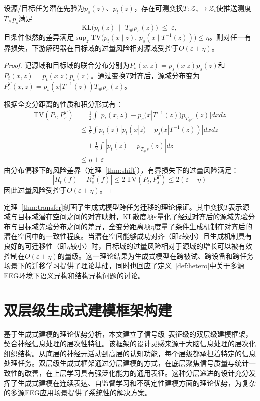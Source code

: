 \begin{theorem}[潜在对齐下的跨任务迁移界]
\label{thm:transfer}
设源/目标任务潜在先验为$p_s(z)$、$p_t(z)$，存在可测变换$T:\mathcal{Z}_s\to\mathcal{Z}_t$使推送测度$T_{\#}p_s$满足
\begin{equation}
\label{eq:latent-align}
\mathrm{KL}\!\big(p_t(z)\,\|\,T_{\#}p_s(z)\big)\;\le\;\varepsilon,
\end{equation}
且条件似然的差异满足$\sup_{z}\mathrm{TV}\!\big(p_t(x\mid z),\,p_s(x\mid T^{-1}(z))\big)\le \eta$。则对任一有界损失，下游解码器在目标域的过量风险相对源域受控于$O(\varepsilon+\eta)$。
\end{theorem}
\begin{proof}
记源域和目标域的联合分布分别为$P_s(x,z) = p_s(x|z)p_s(z)$和$P_t(x,z) = p_t(x|z)p_t(z)$。通过变换$T$对齐后，源域分布变为$P_s^T(x,z) = p_s(x|T^{-1}(z))T_{\#}p_s(z)$。

根据全变分距离的性质和积分形式有：
\begin{equation}
\begin{aligned}
\mathrm{TV}(P_t, P_s^T) &= \frac{1}{2}\int |p_t(x,z) - p_s(x|T^{-1}(z))p_{T_{\#}s}(z)| dxdz\\
&\le \frac{1}{2}\int p_t(z)|p_t(x|z) - p_s(x|T^{-1}(z))| dxdz\\
&\quad + \frac{1}{2}\int |p_t(z) - p_{T_{\#}s}(z)| dz\\
&\le \eta + \varepsilon
\end{aligned}
\end{equation}
由分布偏移下的风险差界（定理~\ref{thm:shift}），有界损失下的过量风险满足：
\begin{equation}
|R_t(f) - R_s^T(f)| \le 2\,\mathrm{TV}(P_t, P_s^T) \le 2(\varepsilon + \eta)
\end{equation}
因此过量风险受控于$O(\varepsilon+\eta)$。
\end{proof}

定理~\ref{thm:transfer}刻画了生成式模型跨任务迁移的理论保证。其中变换$T$表示源域与目标域潜在空间之间的对齐映射，KL散度项$\varepsilon$量化了经过对齐后的源域先验分布与目标域先验分布之间的差异，全变分距离项$\eta$度量了条件生成机制在对齐后的潜在空间中的一致性程度。当潜在空间能够成功对齐（即$\varepsilon$较小）且生成机制具有良好的可迁移性（即$\eta$较小）时，目标域的过量风险相对于源域的增长可以被有效控制在$O(\varepsilon+\eta)$的量级。这一理论结果为生成式模型在跨被试、跨设备和跨任务场景下的迁移学习提供了理论基础，同时也回应了定义~\ref{def:hetero}中关于多源EEG环境下语义异构和结构异构问题的讨论。


\section{双层级生成式建模框架构建}
基于生成式建模的理论优势分析，本文建立了信号级--表征级的双层级建模框架，契合神经信息处理的层次性特征。该框架的设计灵感来源于大脑信息处理的层次化组织结构。从底层的神经元活动到高层的认知功能，每个层级都承担着特定的信息处理任务。双层级生成式框架通过分层建模的方式，在底层聚焦信号质量与统计一致性的改善，在上层学习具有强泛化能力的通用表征。这种分层递进的设计充分发挥了生成式建模在连续表达、自监督学习和不确定性建模方面的理论优势，为复杂的多源EEG应用场景提供了系统性的解决方案。


